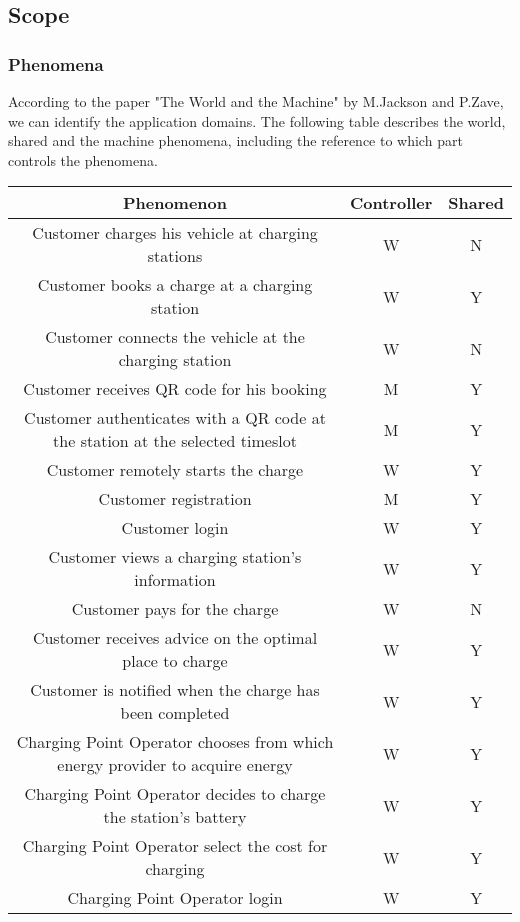 \subsection{Scope}
\subsubsection{Phenomena}
According to the paper "The World and the Machine" by M.Jackson and P.Zave, 
we can identify the application domains. 
The following table describes the world, shared and the machine phenomena, 
including the reference to which part controls the phenomena.
\begin{table}[!h]
        \centering
        \begin{tabular}{|c|c|c|}
        \hline
        \textbf{Phenomenon}                                        & \textbf{Controller} & \textbf{Shared} \\ \hline
        Customer charges his vehicle at charging stations  & W          & N      \\ \hline
        Customer books a charge at a charging station         & W          & Y      \\ \hline
        Customer connects the vehicle at the charging station              & W          & N      \\ \hline
        Customer receives QR code for his booking      & M          & Y      \\ \hline
        Customer authenticates with a QR code at the station at the selected timeslot      & M          & Y      \\ \hline
        Customer remotely starts the charge                   & W          & Y      \\ \hline       
        Customer registration                                 & M          & Y      \\ \hline
        Customer login                                        & W          & Y      \\ \hline
        Customer views a charging station's information       & W          & Y      \\ \hline
        Customer pays for the charge                          & W          & N      \\ \hline
        Customer receives advice on the optimal place to charge            & W          & Y      \\ \hline
        Customer is notified when the charge has been completed   & W          & Y      \\ \hline
        Charging Point Operator chooses from which energy provider to acquire energy   & W          & Y      \\ \hline
        Charging Point Operator decides to charge the station's battery    & W          & Y      \\ \hline
        Charging Point Operator select the cost for charging &W          & Y      \\ \hline
        Charging Point Operator login &W          & Y      \\ \hline
       \end{tabular}
\end{table}

